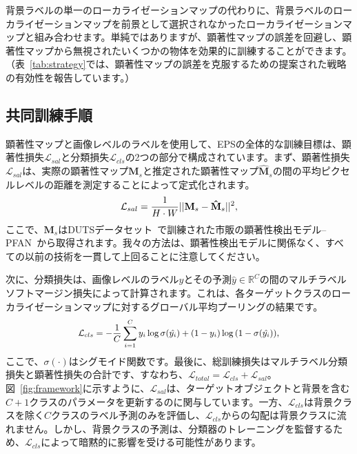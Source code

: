 \documentclass[final]{cvpr}
\begin{document}
背景ラベルの単一のローカライゼーションマップの代わりに、背景ラベルのローカライゼーションマップを前景として選択されなかったローカライゼーションマップと組み合わせます。単純ではありますが、顕著性マップの誤差を回避し、顕著性マップから無視されたいくつかの物体を効果的に訓練することができます。（表~\ref{tab:strategy}では、顕著性マップの誤差を克服するための提案された戦略の有効性を報告しています。）

\subsection{共同訓練手順}\label{section3.3}

顕著性マップと画像レベルのラベルを使用して、EPSの全体的な訓練目標は、顕著性損失$\mathcal{L}_{sal}$と分類損失$\mathcal{L}_{cls}$の2つの部分で構成されています。まず、顕著性損失$\mathcal{L}_{sal}$は、実際の顕著性マップ$\mathbf{M}_{s}$と推定された顕著性マップ$\mathbf{\hat{M}}_{s}$の間の平均ピクセルレベルの距離を測定することによって定式化されます。\vspace{-1mm}
\begin{equation}
{\small
\label{loss_sal}
\mathcal{L}_{sal} = \frac{1}{H\cdot W}||\mathbf{M}_{s}-\mathbf{\hat{M}}_{s}||^{2},
}\vspace{-1mm}
\end{equation}
\noindent ここで、$\mathbf{M}_{s}$はDUTSデータセット~\cite{wang2017learning}で訓練された市販の顕著性検出モデル-- PFAN~\cite{zhao2019pyramid}から取得されます。我々の方法は、顕著性検出モデルに関係なく、すべての以前の技術を一貫して上回ることに注意してください。

次に、分類損失は、画像レベルのラベル$y$とその予測$\hat{y} \in \mathbb{R}^C$の間のマルチラベルソフトマージン損失によって計算されます。これは、各ターゲットクラスのローカライゼーションマップに対するグローバル平均プーリングの結果です。\vspace{-1mm}
\begin{equation}
{\small
\begin{split}
\label{loss_cls}
\mathcal{L}_{cls}= - \frac{1}{C} \sum_{i=1}^{C} y_i \log{\sigma(\hat{y_i})} + (1-y_i) \log{(1 - \sigma(\hat{y_i}))},
\end{split}}\vspace{-1mm}
\end{equation}
\noindent ここで、$\sigma(\cdot)$はシグモイド関数です。最後に、総訓練損失はマルチラベル分類損失と顕著性損失の合計です、すなわち、$\mathcal{L}_{total} = \mathcal{L}_{cls} + \mathcal{L}_{sal}$。
図~\ref{fig:framework}に示すように、$\mathcal{L}_{sal}$は、ターゲットオブジェクトと背景を含む$C+1$クラスのパラメータを更新するのに関与しています。一方、$\mathcal{L}_{cls}$は背景クラスを除く$C$クラスのラベル予測のみを評価し、$\mathcal{L}_{cls}$からの勾配は背景クラスに流れません。しかし、背景クラスの予測は、分類器のトレーニングを監督するため、$\mathcal{L}_{cls}$によって暗黙的に影響を受ける可能性があります。
\end{document}
